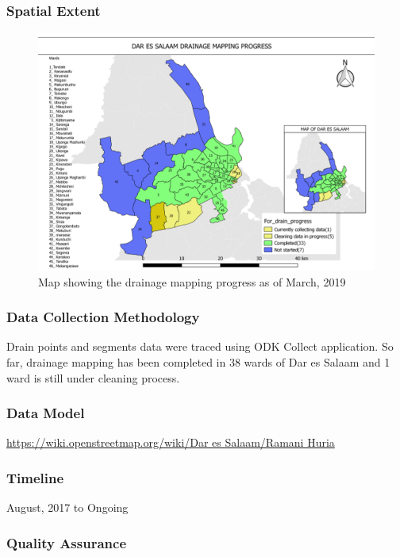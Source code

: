 \documentclass[a4paper,12pt,twoside]{article}
\begin{document}
\subsubsection{Spatial Extent}
\begin{figure}[h]
  \color{RHgreen}\caption{Map showing the drainage mapping progress as of March, 2019}
  \centering
  \includegraphics[width=1\textwidth]{images/Dar_drainage_mapping_progress.png}
\end{figure}

\subsubsection{Data Collection Methodology}

Drain points and segments data were traced using ODK Collect application. So far, drainage mapping has been completed in 38 wards of Dar es Salaam and 1 ward is still under cleaning process.

\subsubsection{Data Model}
\href{https://wiki.openstreetmap.org/wiki/Dar_es_Salaam/Ramani_Huria}{https://wiki.openstreetmap.org/wiki/Dar es Salaam/Ramani Huria}

\subsubsection{Timeline}
August, 2017 to Ongoing

\subsubsection{Quality Assurance}
\end{document}
